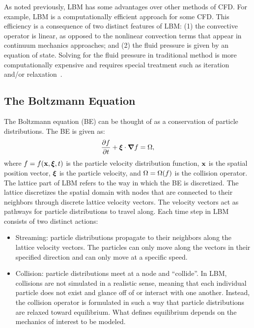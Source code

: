 As noted previously, LBM has some advantages over other methods of CFD.
For example, LBM is a computationally efficient approach for some CFD.
This efficiency is a consequence of two distinct features of LBM: (1) the convective operator is linear, as opposed to the nonlinear convection terms that appear in continuum mechanics approaches; and (2) the fluid pressure is given by an equation of state.
Solving for the fluid pressure in traditional method is more computationally expensive and requires special treatment such as iteration and/or relaxation~\cite{chen1998lattice}.

\subsection{The Boltzmann Equation}
The Boltzmann equation (BE) can be thought of as a conservation of particle distributions.
The BE is given as:
\begin{equation}
\frac{\partial f}{\partial t} + \boldsymbol{\xi} \cdot \boldsymbol{\nabla} f = \Omega,
\end{equation}
\noindent where $f = f(\mathbf{x}, \boldsymbol{\xi}, t)$ is the particle velocity distribution function, $\mathbf{x}$ is the spatial position vector, $\boldsymbol{\xi}$ is the particle velocity, and $\Omega = \Omega(f)$ is the collision operator.
The lattice part of LBM refers to the way in which the BE is discretized.
The lattice discretizes the spatial domain with nodes that are connected to their neighbors through discrete lattice velocity vectors.
The velocity vectors act as pathways for particle distributions to travel along.
Each time step in LBM consists of two distinct actions:

\begin{itemize}
\item Streaming: particle distributions propagate to their neighbors along the lattice velocity vectors.
The particles can only move along the vectors in their specified direction and can only move at a specific speed.
\item Collision: particle distributions meet at a node and ``collide''.
In LBM, collisions are not simulated in a realistic sense, meaning that each individual particle does not exist and glance off of or interact with one another.
Instead, the collision operator is formulated in such a way that particle distributions are relaxed toward equilibrium.
What defines equilibrium depends on the mechanics of interest to be modeled.
\end{itemize}


